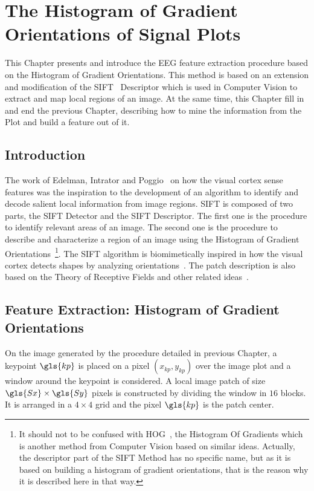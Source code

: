 \chapter{The Histogram of Gradient Orientations of Signal Plots}
\label{chapter:three}

This Chapter presents and introduce the EEG feature extraction procedure based on the Histogram of Gradient Orientations.  This method is based on an extension and modification of the SIFT~\cite{Lowe2004} Descriptor which is used in Computer Vision to extract and map local regions of an image.  At the same time, this Chapter fill in and end the previous Chapter, describing how to mine the information from the Plot and build a feature out of it.

\section{Introduction}


The work of Edelman, Intrator and Poggio~\cite{cogprints561} on how the visual cortex sense features was the inspiration to the development of an algorithm to identify and decode salient local information from image regions.  SIFT is composed of two parts, the SIFT Detector and the SIFT Descriptor.  The first one is the procedure to identify relevant areas of an image.  The second one is the procedure to describe and characterize a region of an image using the Histogram of Gradient Orientations~\footnote{It should not to be confused with HOG~\cite{Dalal2005}, the Histogram Of Gradients which is another method from Computer Vision based on similar ideas.  Actually, the descriptor part of the SIFT Method has no specific name, but as it is based on building a histogram of gradient orientations, that is the reason why it is described here in that way. }.  The SIFT algorithm is biomimetically inspired in how the visual cortex detects shapes by analyzing orientations~\cite{cogprints561}.  The patch description is also based on the Theory of Receptive Fields and other related ideas~\cite{Lindeberg2013}.

\section{Feature Extraction: Histogram of Gradient Orientations}
\label{SIFT}

On the image generated by the procedure detailed in previous Chapter, a keypoint $\gls{kp}$ is placed on a pixel $(x_{kp}, y_{kp})$ over the image plot and a window around the keypoint is considered. A local image patch of size $\gls{Sx} \times \gls{Sy}$ pixels is constructed by dividing the window in $16$ blocks. It is arranged in a $4 \times 4$ grid and the pixel $\gls{kp}$ is the patch center. 

